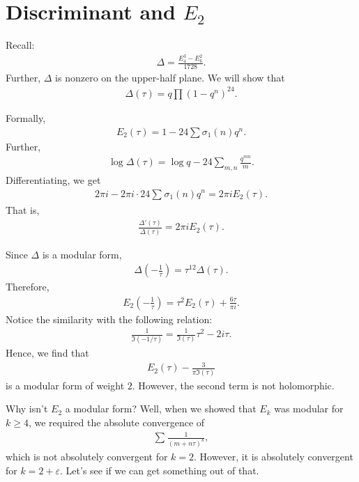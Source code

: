 \documentclass[11pt, oneside,margin=1in]{article}
\begin{document}
\section{Discriminant and $E_2$}
Recall:
\begin{align*}
	\Delta = \frac{E_4^3 - E_6^2}{1728}.
\end{align*}
Further, $\Delta$ is nonzero on the upper-half plane. We will show that 
\begin{align*}
	\Delta(\tau) = q \prod  (1-q^n)^{24}.
\end{align*}

Formally,
\begin{align*}
E_2(\tau) = 1 - 24 \sum \sigma_1(n)q^n.	
\end{align*}
Further,
\begin{align*}
	\log \Delta (\tau ) = \log q - 24  \sum_{m,n}^{} \frac{q^{mn}}{m}.
\end{align*}
Differentiating, we get
\begin{align*}
	2\pi i - 2\pi i \cdot 24 \sum_{}^{} \sigma_1(n) q^n = 2\pi iE_2(\tau).
\end{align*}
That is,
\begin{align*}
	\frac{\Delta'(\tau)}{\Delta (\tau)} = 2\pi i E_2(\tau).
\end{align*}

Since $\Delta$ is a modular form,
\begin{align*}
	\Delta \left( -\frac{1}{\tau} \right) = \tau^{12} \Delta(\tau). 
\end{align*}
Therefore,
\begin{align*}
	E_2 \left( -\frac{1}{\tau} \right) = \tau^2  E_2(\tau) +  \frac{6\tau}{\pi i}.
\end{align*}
Notice the similarity with the following relation:
\begin{align*}
	\frac{1}{\Im(-1/\tau)} = \frac{1}{\Im(\tau)}\tau^2 - 2i\tau.
\end{align*}
Hence, we find that
\begin{align*}
	E_2(\tau) -  \frac{3}{\pi \Im(\tau)}
\end{align*}
is a modular form of weight $2$. However, the second term is not holomorphic.

Why isn't $E_2$ a modular form? Well, when we showed that $E_k$ was modular for $k\ge 4$, we required the absolute convergence of 
\begin{align*}
	\sum_{}^{} \frac{1}{(m+n\tau)^k},
\end{align*}
which is not absolutely convergent for $k=2$. However, it is absolutely convergent for $k= 2+\varepsilon$. Let's see if we can get something out of that.
\end{document}
